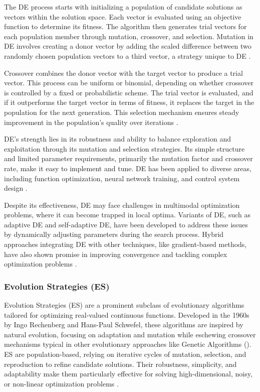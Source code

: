 The DE process starts with initializing a population of candidate solutions as vectors within the solution space. Each vector is evaluated using an objective function to determine its fitness. The algorithm then generates trial vectors for each population member through mutation, crossover, and selection. Mutation in DE involves creating a donor vector by adding the scaled difference between two randomly chosen population vectors to a third vector, a strategy unique to DE \parencite{mezura2006comparative}.

Crossover combines the donor vector with the target vector to produce a trial vector. This process can be uniform or binomial, depending on whether crossover is controlled by a fixed or probabilistic scheme. The trial vector is evaluated, and if it outperforms the target vector in terms of fitness, it replaces the target in the population for the next generation. This selection mechanism ensures steady improvement in the population's quality over iterations \parencite{das2010differential}.

DE's strength lies in its robustness and ability to balance exploration and exploitation through its mutation and selection strategies. Its simple structure and limited parameter requirements, primarily the mutation factor and crossover rate, make it easy to implement and tune. DE has been applied to diverse areas, including function optimization, neural network training, and control system design \parencite{miettinen1999nonlinear}.

Despite its effectiveness, DE may face challenges in multimodal optimization problems, where it can become trapped in local optima. Variants of DE, such as adaptive DE and self-adaptive DE, have been developed to address these issues by dynamically adjusting parameters during the search process. Hybrid approaches integrating DE with other techniques, like gradient-based methods, have also shown promise in improving convergence and tackling complex optimization problems \parencite{qin2008differential}.



\subsubsection*{Evolution Strategies (ES)}
Evolution Strategies (ES) are a prominent subclass of evolutionary algorithms tailored for optimizing real-valued continuous functions. Developed in the 1960s by Ingo Rechenberg and Hans-Paul Schwefel, these algorithms are inspired by natural evolution, focusing on adaptation and mutation while eschewing crossover mechanisms typical in other evolutionary approaches like Genetic Algorithms (\cite{vent1975rechenberg,schwefel1977numerische}). ES are population-based, relying on iterative cycles of mutation, selection, and reproduction to refine candidate solutions. Their robustness, simplicity, and adaptability make them particularly effective for solving high-dimensional, noisy, or non-linear optimization problems \parencite{beyer2002evolution}.

